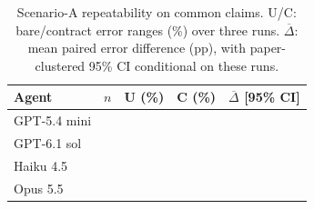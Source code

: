 \begin{table}[t]\centering
\caption{Scenario-A repeatability on common claims. U/C: bare/contract error ranges (\%) over three runs. $\overline{\Delta}$: mean paired error difference (pp), with paper-clustered 95\% CI conditional on these runs.}\label{tab:repeatability}
\scriptsize\setlength{\tabcolsep}{3pt}
\begin{tabular}{@{}lrccc@{}}\toprule
Agent & $n$ & U (\%) & C (\%) & $\overline{\Delta}$ [95\% CI] \\\midrule
GPT-5.4 mini & \fuMiniN{} & \fuMiniUWrong{} & \fuMiniCWrong{} & \fuMiniDelta{} \fuMiniDeltaCi{} \\
GPT-6.1 sol & \fuSolN{} & \fuSolUWrong{} & \fuSolCWrong{} & \fuSolDelta{} \fuSolDeltaCi{} \\
Haiku 4.5 & \fuHaikuN{} & \fuHaikuUWrong{} & \fuHaikuCWrong{} & \fuHaikuDelta{} \fuHaikuDeltaCi{} \\
Opus 5.5 & \fuOpusN{} & \fuOpusUWrong{} & \fuOpusCWrong{} & \fuOpusDelta{} \fuOpusDeltaCi{} \\
\bottomrule\end{tabular}\end{table}
